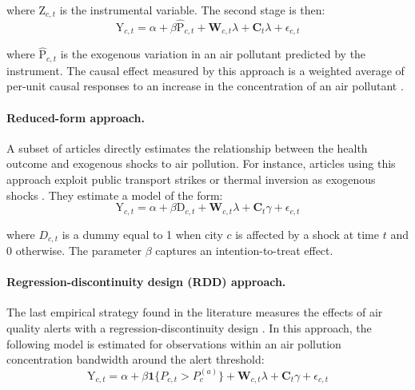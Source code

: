 \documentclass[12pt]{article}
\begin{document}
        \noindent where $\text{Z}_{c,t}$ is the instrumental variable. The second stage is then:
        ~
        \begin{equation*}
        \text{Y}_{c,t} = \alpha + \beta\widehat{\text{P}}_{c,t} + \textbf{W}_{c,t}\lambda + \textbf{C}_{t}\lambda + \epsilon_{c,t}
        \end{equation*}
        
        \noindent where $\widehat{\text{P}}_{c,t}$ is the exogenous variation in an air pollutant predicted by the instrument. The causal effect measured by this approach is a weighted average of per-unit causal responses to an increase in the concentration of an air pollutant \citep{angrist_two-stage_1995}.

        \paragraph{Reduced-form approach.} A subset of articles directly estimates the relationship between the health outcome and exogenous shocks to air pollution. For instance, articles using this approach exploit public transport strikes or thermal inversion as exogenous shocks \citep{bauernschuster_when_2017, jans_economic_2018, godzinski2019short, giaccherini_when_2021}. They estimate a model of the form:
        ~
        \begin{equation*}
        \text{Y}_{c,t} = \alpha + \beta\text{D}_{c,t} + \textbf{W}_{c,t}\lambda + \textbf{C}_{t}\gamma + \epsilon_{c,t}
        \end{equation*}
        
        \noindent where $D_{c,t}$ is a dummy equal to 1 when city $c$ is affected by a shock at time $t$ and 0 otherwise. The parameter $\beta$ captures an intention-to-treat effect.

        \begin{sloppypar}
        \paragraph{Regression-discontinuity design (RDD) approach.} The last empirical strategy found in the literature measures the effects of air quality alerts with a regression-discontinuity design \citep{chen_effect_2018, anderson2022bounds}. In this approach, the following model is estimated for observations within an air pollution concentration bandwidth around the alert threshold:
        ~
        \begin{equation*}
        \text{Y}_{c,t} = \alpha + \beta \textbf{1}\{P_{c,t} > P^{(a)}_{c}\} + \textbf{W}_{c,t}\lambda + \textbf{C}_{t}\gamma + \epsilon_{c,t}
        \end{equation*}
        \end{sloppypar}
        
\end{document}
